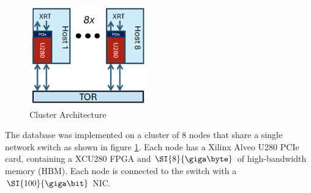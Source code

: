 
\begin{figure}
	\centering
	\includegraphics[width=2in]{oct-arch.jpg}
	\caption{Cluster Architecture}
	\label{oct-arch}
\end{figure}

The database was implemented on a cluster of 8 nodes that share a single network switch as shown in figure \ref{oct-arch}. Each node has a Xilinx Alveo U280 PCIe card, containing a XCU280 FPGA and $\SI{8}{\giga\byte}$ of high-bandwidth memory (HBM). Each node is connected to the switch with a $\SI{100}{\giga\bit}$ NIC.

